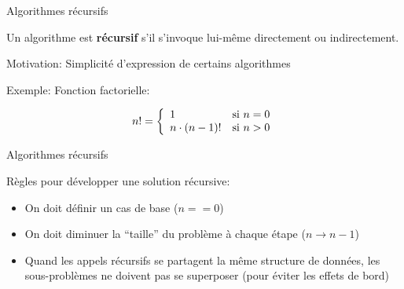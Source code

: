 
\begin{frame}{Algorithmes récursifs}

Un algorithme est {\bf récursif} s'il s'invoque lui-même
directement ou indirectement.

\bigskip

Motivation: Simplicité d'expression de certains algorithmes

\bigskip

Exemple: Fonction factorielle:

\[n!=\left\{\begin{array}{ll}
1 &\mbox{si }n=0\\
n \cdot (n-1)! &\mbox{si }n>0$$
\end{array}
\right.
\]

\begin{center}
\end{center}

\end{frame}

\begin{frame}{Algorithmes récursifs}

\begin{center}
\end{center}

\bigskip

Règles pour développer une solution récursive:
\bigskip
\begin{itemize}
\item On doit définir un cas de base ($n==0$)
\item On doit diminuer la ``taille'' du problème à chaque étape ($n\rightarrow n-1$)
\item Quand les appels récursifs se partagent la même structure de données, les sous-problèmes ne doivent pas se superposer (pour éviter les effets de bord)
\end{itemize}
\end{frame}

